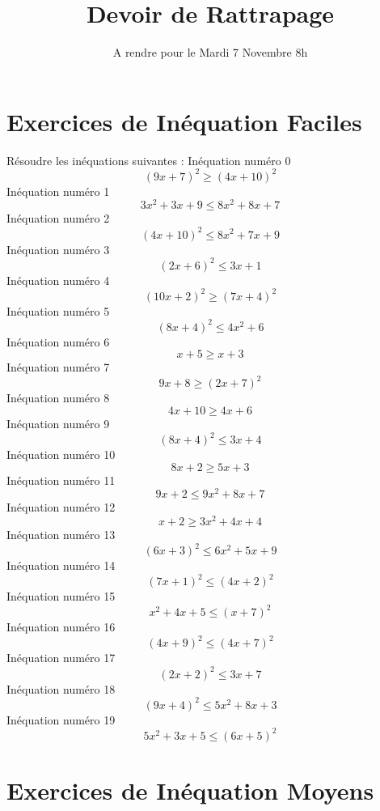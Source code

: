 \documentclass{article}
\title{Devoir de Rattrapage}
\date{A rendre pour le Mardi 7 Novembre 8h}\usepackage{natbib}
\begin{document}
\maketitle
 \section{Exercices de In\'equation Faciles}

 R\'esoudre les in\'equations suivantes : 
In\'equation num\'ero 0 \[\left(9 x + 7\right)^{2} \geq \left(4 x + 10\right)^{2}\]In\'equation num\'ero 1 \[3 x^{2} + 3 x + 9 \leq 8 x^{2} + 8 x + 7\]In\'equation num\'ero 2 \[\left(4 x + 10\right)^{2} \leq 8 x^{2} + 7 x + 9\]In\'equation num\'ero 3 \[\left(2 x + 6\right)^{2} \leq 3 x + 1\]In\'equation num\'ero 4 \[\left(10 x + 2\right)^{2} \geq \left(7 x + 4\right)^{2}\]In\'equation num\'ero 5 \[\left(8 x + 4\right)^{2} \leq 4 x^{2} + 6\]In\'equation num\'ero 6 \[x + 5 \geq x + 3\]In\'equation num\'ero 7 \[9 x + 8 \geq \left(2 x + 7\right)^{2}\]In\'equation num\'ero 8 \[4 x + 10 \geq 4 x + 6\]In\'equation num\'ero 9 \[\left(8 x + 4\right)^{2} \leq 3 x + 4\]In\'equation num\'ero 10 \[8 x + 2 \geq 5 x + 3\]In\'equation num\'ero 11 \[9 x + 2 \leq 9 x^{2} + 8 x + 7\]In\'equation num\'ero 12 \[x + 2 \geq 3 x^{2} + 4 x + 4\]In\'equation num\'ero 13 \[\left(6 x + 3\right)^{2} \leq 6 x^{2} + 5 x + 9\]In\'equation num\'ero 14 \[\left(7 x + 1\right)^{2} \leq \left(4 x + 2\right)^{2}\]In\'equation num\'ero 15 \[x^{2} + 4 x + 5 \leq \left(x + 7\right)^{2}\]In\'equation num\'ero 16 \[\left(4 x + 9\right)^{2} \leq \left(4 x + 7\right)^{2}\]In\'equation num\'ero 17 \[\left(2 x + 2\right)^{2} \leq 3 x + 7\]In\'equation num\'ero 18 \[\left(9 x + 4\right)^{2} \leq 5 x^{2} + 8 x + 3\]In\'equation num\'ero 19 \[5 x^{2} + 3 x + 5 \leq \left(6 x + 5\right)^{2}\]
 \section{Exercices de In\'equation Moyens}
\end{document}

